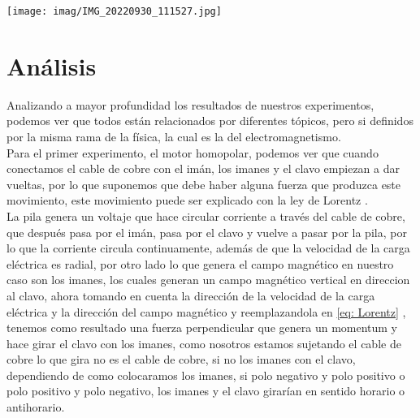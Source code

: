 \documentclass[]{article}
\newenvironment{Figura}
  {\par\medskip\noindent\minipage{\linewidth}}
  {\endminipage\par\medskip}
\begin{document}
\begin{multicols*}{2}
\begin{Figura}
    \centering
    \texttt{[image: imag/IMG\_20220930\_111527.jpg]}
\end{Figura}


    
\section*{Análisis}
Analizando a mayor profundidad los resultados de nuestros experimentos, podemos ver que todos están relacionados por diferentes tópicos, pero si definidos por la misma rama de la física, la cual es la del electromagnetismo.\\
Para el primer experimento, el motor homopolar, podemos ver que cuando conectamos el cable de cobre con el imán, los imanes y el clavo empiezan a dar vueltas, por lo que suponemos que debe haber alguna fuerza que produzca este movimiento, 
este movimiento puede ser explicado con la ley de Lorentz \cite{Ley-de-Lorentz}.\\
La pila genera un voltaje que hace circular corriente a través del cable de cobre, que después pasa por el imán, pasa por el clavo y vuelve a pasar por la pila, por lo que la corriente circula continuamente, además de que 
la velocidad de la carga eléctrica es radial, por otro lado lo que genera el campo magnético en nuestro caso son los imanes, los cuales generan un campo magnético vertical en direccion al clavo, ahora tomando en cuenta la dirección de la velocidad 
de la carga eléctrica y la dirección del campo magnético y reemplazandola en \eqref{eq: Lorentz} , tenemos como resultado una fuerza perpendicular que genera un momentum y hace girar el clavo con los imanes, como nosotros estamos sujetando el cable 
de cobre lo que gira no es el cable de cobre, si no los imanes con el clavo, dependiendo de como colocaramos los imanes, si  polo negativo y polo positivo o polo positivo y polo negativo, los imanes y el clavo girarían en sentido horario o antihorario.\\
\vspace{0.3cm}


\end{multicols*}
\end{document}
